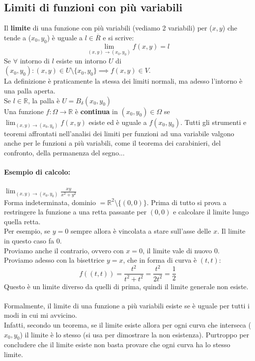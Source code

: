 \documentclass[12pt,a4paper]{article}
\begin{document}
\subsection{Limiti di funzioni con più variabili}
Il \textbf{limite} di una funzione con più variabili (vediamo 2 variabili) per ($x,y$) che tende a ($x_0,y_0$) è uguale a $l \in \overline{R}$ e si scrive:
\[
\lim_{(x,y) \to (x_0,y_0)} f(x,y) = l
\]
Se $\forall$ intorno di $l$ esiste un intorno $U$ di $(x_0,y_0) : (x,y) \in U \setminus \{x_0,y_0\} \implies f(x,y) \in V$.\\
La definizione è praticamente la stessa dei limiti normali, ma adesso l'intorno è una palla aperta.\\
Se $l \in \mathbb{R}$, la palla è $U = B_{\delta}(x_0,y_0)$\\
Una funzione $f:\Omega \to \mathbb{R}$ è \textbf{continua} in $(x_0,y_0) \in \Omega$ se $\lim_{(x,y) \to (x_0,y_0)} f(x,y)$ esiste ed è uguale a $f(x_0,y_0)$.
Tutti gli strumenti e teoremi affrontati nell'analisi dei limiti per funzioni ad una variabile valgono anche per le funzioni a più variabili, come il teorema dei carabinieri, del confronto, della permanenza del segno...\\
\paragraph{Esempio di calcolo:} $\lim_{(x,y) \to (x_0,y_0)} \frac{xy}{x^2 + y^2}$\\
Forma indeterminata, dominio $= \mathbb{R}^2 \setminus \{(0,0)\}$. Prima di tutto si prova a restringere la funzione a una retta passante per $(0,0)$ e calcolare il limite lungo quella retta.\\
Per esempio, se $y = 0$ sempre allora è vincolata a stare sull'asse delle $x$. Il limite in questo caso fa $0$.\\
Proviamo anche il contrario, ovvero con $x = 0$, il limite vale di nuovo $0$.\\
Proviamo adesso con la bisettrice $y = x$, che in forma di curva è $(t,t)$:
\[
f((t,t)) = \frac{t^2}{t^2 + t^2} = \frac{t^2}{2t^2} = \frac{1}{2} 
\]
Questo è un limite diverso da quelli di prima, quindi il limite generale non esiste.\\\\
Formalmente, il limite di una funzione a più variabili esiste se è uguale per tutti i modi in cui mi avvicino.\\
Infatti, secondo un teorema, se il limite esiste allora per ogni curva che interseca ($x_0,y_0$) il limite è lo stesso (si usa per dimostrare la non esistenza).
Purtroppo per concludere che il limite esiste non basta provare che ogni curva ha lo stesso limite.
\end{document}
